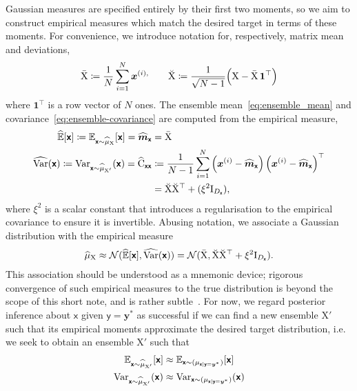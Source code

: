 \documentclass[wcp]{jmlr} %
\newcommand{\Ex}{\mathbb{E}}
\newcommand{\var}{\operatorname{Var}}
\newcommand{\vv}[1]{\boldsymbol{#1}}
\newcommand{\mm}[1]{\mathrm{#1}}
\newcommand{\mmmean}[1]{\bar{\mathrm{#1}}}
\newcommand{\mmdev}[1]{\breve{\mathrm{#1}}}
\newcommand{\rv}[1]{\mathsf{#1}}
\newcommand{\vrv}[1]{\vv{\rv{#1}}}
\newcommand{\Normal}{\mathcal{N}}
\newcommand{\gvn}{\mid}
\begin{document}
Gaussian measures are specified entirely by their first two moments, so we aim to construct empirical measures which match the desired target in terms of these moments.
For convenience, we introduce notation for, respectively, matrix mean and deviations,
\begin{align}
    \mmmean{X} \coloneq \frac{1}{N}\sum_{i=1}^N \vv{x}^{(i),}
    \quad\quad
    \mmdev{X} \coloneq \frac{1}{\sqrt{N-1}} \Bigl( \mm{X} - \mmmean{X}\,\vv{1}^\top \Bigr)
     \label{eq:deviation_matrix}
\end{align}
where \(\vv{1}^\top\) is a row vector of \(N\) ones.
The ensemble mean~\eqref{eq:ensemble_mean} and covariance~\eqref{eq:ensemble-covariance} are computed from the empirical measure,
\begin{align}
    \widehat{\Ex}[\vrv{x}]\coloneq \Ex_{\vrv{x}\sim \ELaw[\mm{X}]}[ \vrv{x}] =\widehat{\vv{m}}_{\vrv{x}}
&=\mmmean{X}\label{eq:ensemble_mean} \\
\widehat{\var}(\vrv{x}) \coloneq\var_{\vrv{x}\sim \ELaw[\mm{X}']} (\vrv{x})=\widehat{\mm{C}}_{\vrv{xx}} &\coloneq \frac{1}{N-1} \sum_{i=1}^{N} \left(\vv{x}^{(i)} - \widehat{\vv{m}}_{\vrv{x}}\right)\left(\vv{x}^{(i)} - \widehat{\vv{m}}_{\vrv{x}}\right)^\top  \\
&=\mmdev{X} \mmdev{X}^\top + (\xi^2\mm{I}_{D_{\vrv{x}}}),\label{eq:ensemble-covariance}
\end{align}
where \(\xi^2\) is a scalar constant that introduces a regularisation to the empirical covariance to ensure it is invertible.
Abusing notation, we associate a Gaussian distribution with the empirical measure
\begin{align}
\ELaw[\mm{X}] \approx \Normal(\widehat{\Ex}[\vrv{x}], \widehat{\var}(\vrv{x})) = \Normal(\mmmean{X}, \mmdev{X} \mmdev{X}^\top + \xi^2\mm{I}_{D_{\vrv{x}}}).
\end{align}
This association should be understood as a mnemonic device;
rigorous convergence of such empirical measures to the true distribution is beyond the scope of this short note, and is rather subtle~\citep{LeGland2009Large,Mandel2011Convergence,Kelly2014Wellposedness,Kwiatkowski2015Convergence,DelMoral2017Stability}.
For now, we regard posterior inference about $\vrv{x}$ given $\vrv{y}=\vv{y}^*$ as successful if we can find a new ensemble $\mm{X}'$ such that its empirical moments approximate the desired target distribution, i.e. we seek to obtain an ensemble $\mm{X}'$ such that
\begin{align}
    \Ex_{\vrv{x}\sim \ELaw[\mm{X}']}[ \vrv{x}] &\approx \Ex_{\vrv{x}\sim (\Law[\vrv{x} \gvn \vrv{y}=\vv{y}^*])} [\vrv{x}]\\
    \var_{\vrv{x}\sim \ELaw[\mm{X}']} (\vrv{x}) &\approx \var_{\vrv{x}\sim (\Law[\vrv{x} \gvn \vrv{y}=\vv{y}^*])} (\vrv{x})
\end{align}
\end{document}
